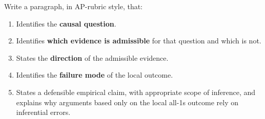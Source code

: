 \documentclass[11pt]{article}
\begin{document}
Write a paragraph, in AP-rubric style, that:
\begin{enumerate}[leftmargin=*]
  \item Identifies the \textbf{causal question}.
  \item Identifies \textbf{which evidence is admissible} for that
  question and which is not.
  \item States the \textbf{direction} of the admissible evidence.
  \item Identifies the \textbf{failure mode} of the local outcome.
  \item States a defensible empirical claim, with appropriate scope
  of inference, and explains why arguments based only on the local
  all-1s outcome rely on inferential errors.
\end{enumerate}
\end{document}

